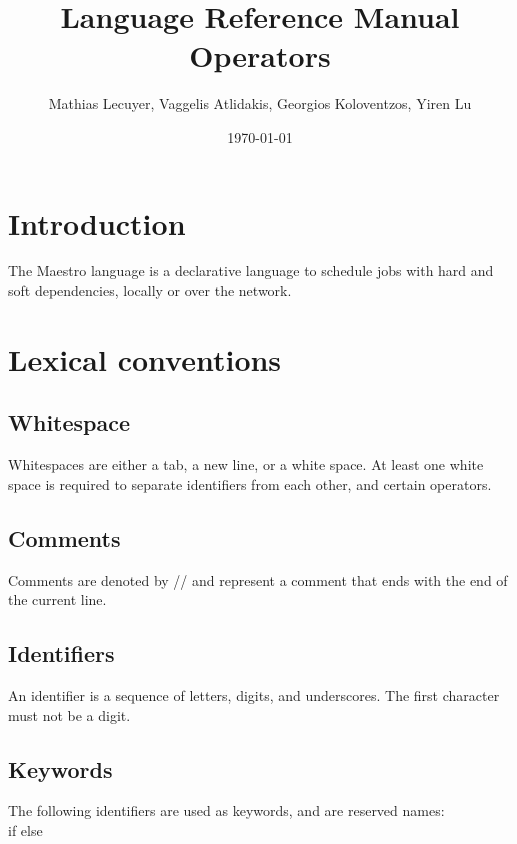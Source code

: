 \documentclass[12pt]{article}
\title{Language Reference Manual Operators}
\author{Mathias Lecuyer, Vaggelis Atlidakis, Georgios Koloventzos, Yiren Lu}
\date{\today}
\begin{document}
\maketitle
\tableofcontents

\section{Introduction}
The Maestro language is a declarative language to schedule jobs with hard and soft dependencies, locally or over the network.

\section{Lexical conventions}
\subsection{Whitespace}
Whitespaces are either a tab, a new line, or a white space. At least one white space is required to separate identifiers from
each other, and certain operators.

\subsection{Comments}
Comments are denoted by // and represent a comment that ends with the end of the current line.

\subsection{Identifiers}
An identifier is a sequence of letters, digits, and underscores. The first character must not be a digit.

\subsection{Keywords}
The following identifiers are used as keywords, and are reserved names:\\
if else
\end{document}
